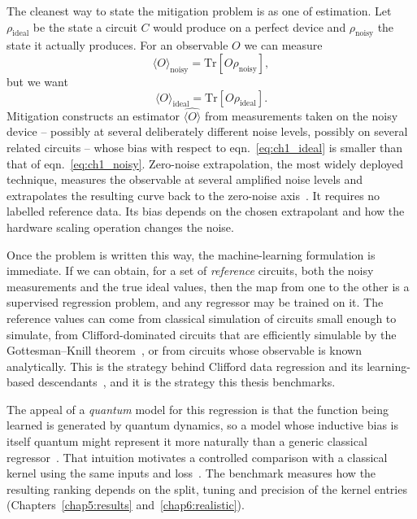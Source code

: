 \documentclass[Thesis.tex]{subfiles}
\begin{document}
The cleanest way to state the mitigation problem is as one of estimation. Let
$\rho_{\text{ideal}}$ be the state a circuit $C$ would produce on a perfect device
and $\rho_{\text{noisy}}$ the state it actually produces. For an observable $O$ we
can measure
\begin{equation}
    \langle O \rangle_{\text{noisy}} = \mathrm{Tr}\!\left[ O \rho_{\text{noisy}} \right],
    \label{eq:ch1_noisy}
\end{equation}
but we want
\begin{equation}
    \langle O \rangle_{\text{ideal}} = \mathrm{Tr}\!\left[ O \rho_{\text{ideal}} \right].
    \label{eq:ch1_ideal}
\end{equation}
Mitigation constructs an estimator $\widehat{\langle O \rangle}$ from measurements
taken on the noisy device -- possibly at several deliberately different noise levels,
possibly on several related circuits -- whose bias with respect to
eqn.~\eqref{eq:ch1_ideal} is smaller than that of eqn.~\eqref{eq:ch1_noisy}. Zero-noise
extrapolation, the most widely deployed technique, measures the observable at several amplified noise levels and extrapolates the resulting curve back to the zero-noise
axis~\cite{temme2017error,giurgicatiron2020digital,he2020zero}. It requires no
labelled reference data. Its bias depends on the chosen extrapolant and how the
hardware scaling operation changes the noise.

Once the problem is written this way, the machine-learning formulation is immediate.
If we can obtain, for a set of \emph{reference} circuits, both the noisy measurements
and the true ideal values, then the map from one to the other is a supervised
regression problem, and any regressor may be trained on it. The reference values can
come from classical simulation of circuits small enough to simulate, from
Clifford-dominated circuits that are efficiently simulable by the Gottesman--Knill
theorem~\cite{nielsen2012book}, or from circuits whose observable is known
analytically. This is the strategy behind Clifford data regression and its
learning-based descendants~\cite{czarnik2021clifford,strikis2021learning,lowe2021unified,liao2024machine}, and it
is the strategy this thesis benchmarks.

The appeal of a \emph{quantum} model for this regression is that the function being
learned is generated by quantum dynamics, so a model whose inductive bias is itself
quantum might represent it more naturally than a generic classical
regressor~\cite{havlicek2019supervised,schuld2021kernel,huang2021power}. That
intuition motivates a controlled comparison with a classical kernel using the same
inputs and loss~\cite{schuld2022isquantum,bowles2024better}. The benchmark measures
how the resulting ranking depends on the split, tuning and precision of the kernel
entries (Chapters~\ref{chap5:results} and~\ref{chap6:realistic}).
\end{document}
